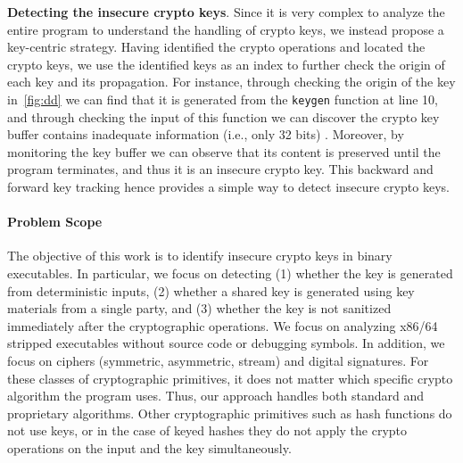 \begin{compactitem}
\item
\textbf{Detecting the insecure crypto keys}.
Since it is very complex to analyze the entire program to understand the handling of crypto keys, we instead propose a key-centric strategy. 
Having identified the crypto operations and located the crypto keys, we use the identified keys as an index to further check the origin of each key and its propagation. 
For instance, through checking the origin of the key in~\autoref{fig:dd} we can find that it is generated from the \texttt{keygen} function at line 10, {and through checking the input of this function we can discover the crypto key buffer contains inadequate information (i.e., only 32 bits) }.
Moreover, by monitoring the key buffer we can observe that its content is preserved until the program terminates, and thus it is an insecure crypto key. 
This backward and forward key tracking hence provides a simple way to detect insecure crypto keys.
\end{compactitem}


\paragraph{Problem Scope}
The objective of this work is to identify  insecure crypto keys in binary executables.
In particular, we focus on detecting (1) whether the key is generated from deterministic inputs, (2) whether a shared key is generated using key materials from a single party, and (3) whether the key is not sanitized immediately after the cryptographic operations. 
%
We focus on analyzing x86/64 stripped executables without source code or debugging symbols. 
In addition, we focus on ciphers (symmetric, asymmetric, stream) and digital signatures. 
For these classes of cryptographic primitives, it does not matter which specific crypto algorithm the program uses.
Thus, our approach handles both standard and proprietary algorithms.
Other cryptographic primitives such as hash functions do not use keys, or in the case of keyed hashes they do not apply the crypto operations on the input and the key simultaneously.

